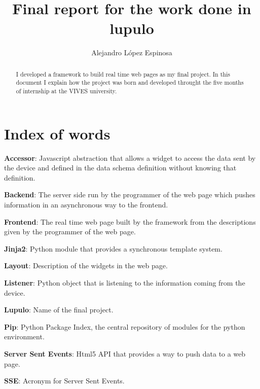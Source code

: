 \documentclass[12pt]{article}
\title{\Huge{\bf Final report for the work done in lupulo}}
\author{\Large{Alejandro López Espinosa}}
\begin{document}
    \maketitle
    \begin{abstract}
        \noindent I developed a framework to build real time web pages as my final
        project. In this document I explain how the project was born and
        developed throught the five months of internship at the VIVES
        university.
    \end{abstract}

    \thispagestyle{empty}

    \newpage
    \tableofcontents
    \thispagestyle{empty}

    \newpage
    \setcounter{page}{1}
    \newpage
        \section{Index of words}
            \setlength{\parindent}{0cm}
            \textbf{Accessor}: Javascript abstraction that allows a
                widget to access the data sent by the device and defined in the
                data schema definition without knowing that definition.

            \textbf{Backend}: The server side run by the programmer of
                the web page which pushes information in an asynchronous way to
                the frontend.

            \textbf{Frontend}: The real time web page built by the
                framework from the descriptions given by the programmer of the
                web page.

            \textbf{Jinja2}: Python module that provides a synchronous
                template system.

            \textbf{Layout}: Description of the widgets in the web
                page.

            \textbf{Listener}: Python object that is listening to the
                information coming from the device.

            \textbf{Lupulo}: Name of the final project.

            \textbf{Pip}: Python Package Index, the central repository
                of modules for the python environment.

            \textbf{Server Sent Events}: Html5 API that provides a way
                to push data to a web page.

            \textbf{SSE}: Acronym for Server Sent Events.
\end{document}
